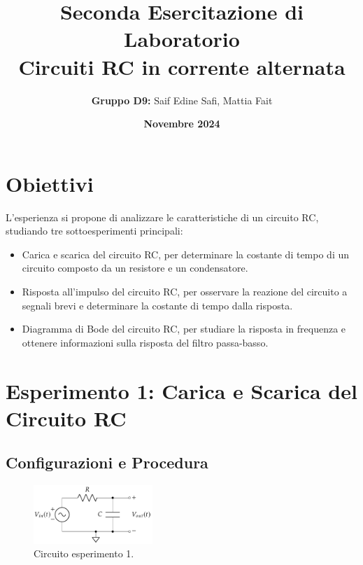 \documentclass[a4paper,12pt]{article}
\title{\Large\textbf{Seconda Esercitazione di Laboratorio}\\ \vspace{0.5em} \large Circuiti RC in corrente alternata}
\author{\textbf{Gruppo D9:} Saif Edine Safi, Mattia Fait}
\date{\textbf{Novembre 2024}}
\begin{document}
\maketitle

\tableofcontents %
\newpage

    
\section{Obiettivi}
L'esperienza si propone di analizzare le caratteristiche di un circuito RC, studiando tre sottoesperimenti principali:
\begin{itemize}
    \item Carica e scarica del circuito RC, per determinare la costante di tempo di un circuito composto da un resistore e un condensatore.
    \item Risposta all'impulso del circuito RC, per osservare la reazione del circuito a segnali brevi e determinare la costante di tempo dalla risposta.
    \item Diagramma di Bode del circuito RC, per studiare la risposta in frequenza e ottenere informazioni sulla risposta del filtro passa-basso.
\end{itemize}


\section{Esperimento 1: Carica e Scarica del Circuito RC}

\subsection{Configurazioni e Procedura}



\begin{figure}[h!]
    \centering
    \includegraphics[width=0.4\textwidth]{assets/I.png}
    \caption{Circuito esperimento 1.}
    \label{fig:exp1}
\end{figure}
\end{document}
